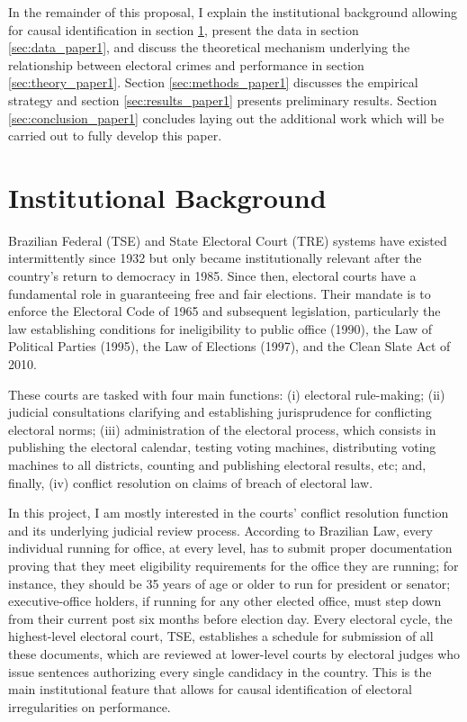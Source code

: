 \documentclass[11pt]{article}
\begin{document}
In the remainder of this proposal, I explain the institutional background allowing for causal identification in section \ref{sec:background_paper1}, present the data in section \ref{sec:data_paper1}, and discuss the theoretical mechanism underlying the relationship between electoral crimes and performance in section \ref{sec:theory_paper1}. Section \ref{sec:methods_paper1} discusses the empirical strategy and section \ref{sec:results_paper1} presents preliminary results. Section \ref{sec:conclusion_paper1} concludes laying out the additional work which will be carried out to fully develop this paper.

\section{Institutional Background} \label{sec:background_paper1}

Brazilian Federal (TSE) and State Electoral Court (TRE) systems have existed intermittently since 1932 but only became institutionally relevant after the country's return to democracy in 1985. Since then, electoral courts have a fundamental role in guaranteeing free and fair elections. Their mandate is to enforce the Electoral Code of 1965 and subsequent legislation, particularly the law establishing conditions for ineligibility to public office (1990), the Law of Political Parties (1995), the Law of Elections (1997), and the Clean Slate Act of 2010.

These courts are tasked with four main functions: (i) electoral rule-making; (ii) judicial consultations clarifying and establishing jurisprudence for conflicting electoral norms; (iii) administration of the electoral process, which consists in publishing the electoral calendar, testing voting machines, distributing voting machines to all districts, counting and publishing electoral results, etc; and, finally, (iv) conflict resolution on claims of breach of electoral law.

In this project, I am mostly interested in the courts' conflict resolution function and its underlying judicial review process. According to Brazilian Law, every individual running for office, at every level, has to submit proper documentation proving that they meet eligibility requirements for the office they are running; for instance, they should be 35 years of age or older to run for president or senator; executive-office holders, if running for any other elected office, must step down from their current post six months before election day. Every electoral cycle, the highest-level electoral court, TSE, establishes a schedule for submission of all these documents, which are reviewed at lower-level courts by electoral judges who issue sentences authorizing every single candidacy in the country. This is the main institutional feature that allows for causal identification of electoral irregularities on performance.
\end{document}
